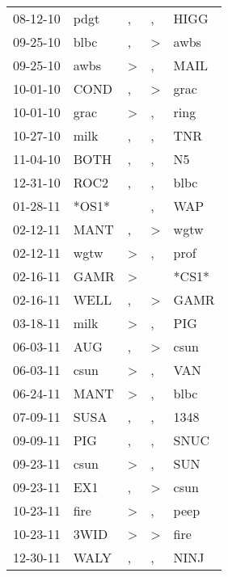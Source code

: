 \begin{supertabular}{lllll}
 08-12-10 &   pdgt &                , &                , &   HIGG \\
 09-25-10 &   blbc &                , &     \textgreater &   awbs \\
 09-25-10 &   awbs &     \textgreater &                , &   MAIL \\
 10-01-10 &   COND &                , &     \textgreater &   grac \\
 10-01-10 &   grac &     \textgreater &                , &   ring \\
 10-27-10 &   milk &                , &                , &    TNR \\
 11-04-10 &   BOTH &                , &                , &     N5 \\
 12-31-10 &   ROC2 &                , &                , &   blbc \\
 01-28-11 &  *OS1* &                  &                , &    WAP \\
 02-12-11 &   MANT &                , &     \textgreater &   wgtw \\
 02-12-11 &   wgtw &     \textgreater &                , &   prof \\
 02-16-11 &   GAMR &     \textgreater &                  &  *CS1* \\
 02-16-11 &   WELL &                , &     \textgreater &   GAMR \\
 03-18-11 &   milk &     \textgreater &                , &    PIG \\
 06-03-11 &    AUG &                , &     \textgreater &   csun \\
 06-03-11 &   csun &     \textgreater &                , &    VAN \\
 06-24-11 &   MANT &     \textgreater &                , &   blbc \\
 07-09-11 &   SUSA &                , &                , &   1348 \\
 09-09-11 &    PIG &                , &                , &   SNUC \\
 09-23-11 &   csun &     \textgreater &                , &    SUN \\
 09-23-11 &    EX1 &                , &     \textgreater &   csun \\
 10-23-11 &   fire &     \textgreater &                , &   peep \\
 10-23-11 &   3WID &     \textgreater &     \textgreater &   fire \\
 12-30-11 &   WALY &                , &                , &   NINJ \\

\end{supertabular}

